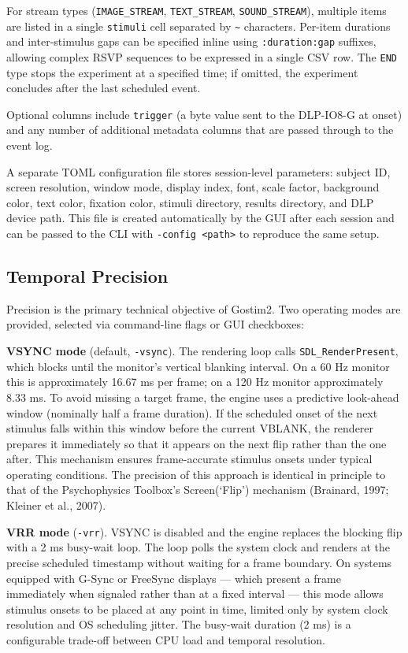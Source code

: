 \documentclass[
  11pt,
]{article}
\begin{document}
For stream types (\texttt{IMAGE\_STREAM}, \texttt{TEXT\_STREAM},
\texttt{SOUND\_STREAM}), multiple items are listed in a single
\texttt{stimuli} cell separated by \texttt{\textasciitilde{}}
characters. Per-item durations and inter-stimulus gaps can be specified
inline using \texttt{:duration:gap} suffixes, allowing complex RSVP
sequences to be expressed in a single CSV row. The \texttt{END} type
stops the experiment at a specified time; if omitted, the experiment
concludes after the last scheduled event.

Optional columns include \texttt{trigger} (a byte value sent to the
DLP-IO8-G at onset) and any number of additional metadata columns that
are passed through to the event log.

A separate TOML configuration file stores session-level parameters:
subject ID, screen resolution, window mode, display index, font, scale
factor, background color, text color, fixation color, stimuli directory,
results directory, and DLP device path. This file is created
automatically by the GUI after each session and can be passed to the CLI
with \texttt{-config\ \textless{}path\textgreater{}} to reproduce the
same setup.

\subsection{Temporal Precision}\label{temporal-precision}

Precision is the primary technical objective of Gostim2. Two operating
modes are provided, selected via command-line flags or GUI checkboxes:

\textbf{VSYNC mode} (default, \texttt{-vsync}). The rendering loop calls
\texttt{SDL\_RenderPresent}, which blocks until the monitor's vertical
blanking interval. On a 60 Hz monitor this is approximately 16.67 ms per
frame; on a 120 Hz monitor approximately 8.33 ms. To avoid missing a
target frame, the engine uses a predictive look-ahead window (nominally
half a frame duration). If the scheduled onset of the next stimulus
falls within this window before the current VBLANK, the renderer
prepares it immediately so that it appears on the next flip rather than
the one after. This mechanism ensures frame-accurate stimulus onsets
under typical operating conditions. The precision of this approach is
identical in principle to that of the Psychophysics Toolbox's
Screen(`Flip') mechanism (Brainard, 1997; Kleiner et al., 2007).

\textbf{VRR mode} (\texttt{-vrr}). VSYNC is disabled and the engine
replaces the blocking flip with a 2 ms busy-wait loop. The loop polls
the system clock and renders at the precise scheduled timestamp without
waiting for a frame boundary. On systems equipped with G-Sync or
FreeSync displays --- which present a frame immediately when signaled
rather than at a fixed interval --- this mode allows stimulus onsets to
be placed at any point in time, limited only by system clock resolution
and OS scheduling jitter. The busy-wait duration (2 ms) is a
configurable trade-off between CPU load and temporal resolution.
\end{document}
